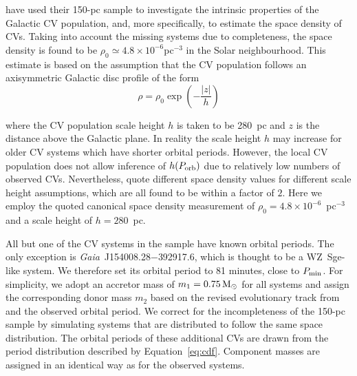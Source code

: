 \documentclass[fleqn,usenatbib]{mnras}
\newcommand{\gaia}{{\it Gaia}}
\begin{document}
\cite{pala20} have used their 150-pc sample to investigate the intrinsic properties of the Galactic CV population, and, more specifically, to estimate the space density of CVs. Taking into account the missing systems due to completeness, the space density is found to be $\rho_0\simeq4.8 \times 10^{-6}$pc$^{-3}$ in the Solar neighbourhood. This estimate is based on the assumption that the CV population follows an axisymmetric Galactic disc profile of the form
\begin{equation}
\label{eq:disk}
    \rho = \rho_{0} \exp \left(-\frac{|z|}{h}\right)
\end{equation}

\noindent where the CV population scale height $h$ is taken to be 280~pc and $z$ is the distance above the Galactic plane. In reality the scale height $h$ may increase for older CV systems which have shorter orbital periods. However, the local CV population does not allow inference of $h(P_{\rm{orb}})$ due to relatively low numbers of observed CVs. Nevertheless, \cite{pala20} quote different space density values for different scale height assumptions, which are all found to be within a factor of $2$. Here we employ the quoted canonical space density measurement of $\rho_0=4.8 \times 10^{-6}$~pc$^{-3}$ and a scale height of $h=280$~pc.


All but one of the CV systems in the \cite{pala20} sample have known orbital periods. The only exception is \gaia\ J154008.28$-$392917.6, which is thought to be a  WZ~Sge-like system. We therefore set its orbital period to 81 minutes, close to $P_{\rm{min}}$. For simplicity, we adopt an accretor mass of $m_1 = 0.75\, \rm{M_{\odot}}$ for all systems and assign the corresponding donor mass $m_2$ based on the revised evolutionary track from \citet{knigge11} and the observed orbital period. We correct for the incompleteness of the \citet{pala20} 150-pc sample by simulating systems that are distributed to follow the same space distribution. 
The orbital periods of these additional CVs are drawn from the period distribution described by Equation~\ref{eq:cdf}. Component masses are assigned in an identical way as for the observed systems. 
\end{document}
